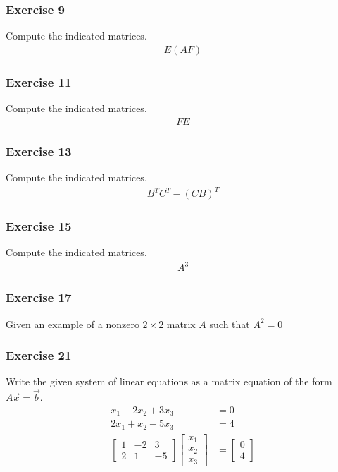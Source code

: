 \documentclass[letterpaper, 12pt]{math}
\begin{document}
\subsubsection*{Exercise 9}
Compute the indicated matrices.
\begin{align*}
  E(AF)
\end{align*}

\subsubsection*{Exercise 11}
Compute the indicated matrices.
\begin{align*}
  FE
\end{align*}

\subsubsection*{Exercise 13}
Compute the indicated matrices.
\begin{align*}
  B^TC^T-(CB)^T
\end{align*}

\subsubsection*{Exercise 15}
Compute the indicated matrices.
\begin{align*}
  A^3
\end{align*}

\subsubsection*{Exercise 17}
Given an example of a nonzero \( 2\times2 \) matrix \( A \) such that
\( A^2 = 0 \)

\subsubsection*{Exercise 21}
Write the given system of linear equations as a matrix equation of the form
\( A\vec{x} = \vec{b} \).
\begin{align*}
  x_1-2x_2+3x_3 &= 0 \\
  2x_1+x_2-5x_3 &= 4 \\
  \begin{bmatrix}
    1 & -2 & 3 \\
    2 & 1 & -5
  \end{bmatrix}\begin{bmatrix}
    x_1 \\ x_2 \\ x_3
  \end{bmatrix} &= \begin{bmatrix}
    0 \\ 4
  \end{bmatrix}
\end{align*}
\end{document}
